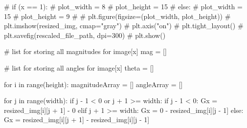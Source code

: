 \documentclass[
  letterpaper,
  DIV=11,
  numbers=noendperiod]{scrreprt}
\newenvironment{Shaded}{\begin{snugshade}}{\end{snugshade}}
\newcommand{\BuiltInTok}[1]{\textcolor[rgb]{0.00,0.23,0.31}{#1}}
\newcommand{\CommentTok}[1]{\textcolor[rgb]{0.37,0.37,0.37}{#1}}
\newcommand{\ControlFlowTok}[1]{\textcolor[rgb]{0.00,0.23,0.31}{#1}}
\newcommand{\DecValTok}[1]{\textcolor[rgb]{0.68,0.00,0.00}{#1}}
\newcommand{\KeywordTok}[1]{\textcolor[rgb]{0.00,0.23,0.31}{#1}}
\newcommand{\NormalTok}[1]{\textcolor[rgb]{0.00,0.23,0.31}{#1}}
\newcommand{\OperatorTok}[1]{\textcolor[rgb]{0.37,0.37,0.37}{#1}}
\begin{document}
\begin{Shaded}
\begin{Highlighting}[]
    \CommentTok{\# if (x == 1):}
    \CommentTok{\#   plot\_width = 8}
    \CommentTok{\#   plot\_height = 15}
    \CommentTok{\# else:}
    \CommentTok{\#   plot\_width = 15}
    \CommentTok{\#   plot\_height = 9}
    \CommentTok{\# }
    \CommentTok{\# plt.figure(figsize=(plot\_width, plot\_height))}
    \CommentTok{\# plt.imshow(resized\_img, cmap="gray")}
    \CommentTok{\# plt.axis("on")}
    \CommentTok{\# plt.tight\_layout()}
    \CommentTok{\# plt.savefig(rescaled\_file\_path, dpi=300)}
    \CommentTok{\# plt.show()}

    
    \CommentTok{\# list for storing all magnitudes for image[x]}
\NormalTok{    mag }\OperatorTok{=}\NormalTok{ []}
    
    \CommentTok{\# list for storing all angles for image[x]}
\NormalTok{    theta }\OperatorTok{=}\NormalTok{ []}
    
    \ControlFlowTok{for}\NormalTok{ i }\KeywordTok{in} \BuiltInTok{range}\NormalTok{(height):}
\NormalTok{        magnitudeArray }\OperatorTok{=}\NormalTok{ []}
\NormalTok{        angleArray }\OperatorTok{=}\NormalTok{ []}

        \ControlFlowTok{for}\NormalTok{ j }\KeywordTok{in} \BuiltInTok{range}\NormalTok{(width):}
            \ControlFlowTok{if}\NormalTok{ j }\OperatorTok{{-}} \DecValTok{1} \OperatorTok{\textless{}} \DecValTok{0} \KeywordTok{or}\NormalTok{ j }\OperatorTok{+} \DecValTok{1} \OperatorTok{\textgreater{}=}\NormalTok{ width:}
                \ControlFlowTok{if}\NormalTok{ j }\OperatorTok{{-}} \DecValTok{1} \OperatorTok{\textless{}} \DecValTok{0}\NormalTok{:}
\NormalTok{                    Gx }\OperatorTok{=}\NormalTok{ resized\_img[i][j }\OperatorTok{+} \DecValTok{1}\NormalTok{] }\OperatorTok{{-}} \DecValTok{0}
                \ControlFlowTok{elif}\NormalTok{ j }\OperatorTok{+} \DecValTok{1} \OperatorTok{\textgreater{}=}\NormalTok{ width:}
\NormalTok{                    Gx }\OperatorTok{=} \DecValTok{0} \OperatorTok{{-}}\NormalTok{ resized\_img[i][j }\OperatorTok{{-}} \DecValTok{1}\NormalTok{]}
            \ControlFlowTok{else}\NormalTok{:}
\NormalTok{                Gx }\OperatorTok{=}\NormalTok{ resized\_img[i][j }\OperatorTok{+} \DecValTok{1}\NormalTok{] }\OperatorTok{{-}}\NormalTok{ resized\_img[i][j }\OperatorTok{{-}} \DecValTok{1}\NormalTok{]}


\end{Highlighting}
\end{Shaded}
\end{document}

